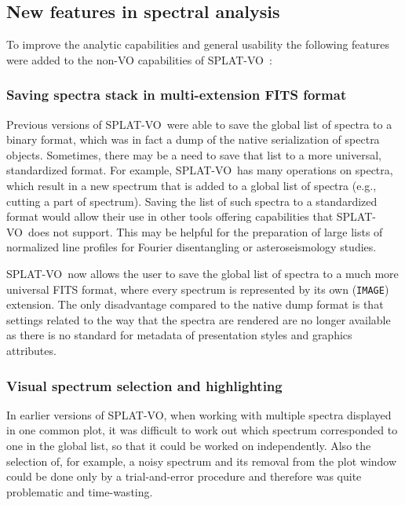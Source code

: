 \documentclass[final,authoryear,5p,times,twocolumn]{elsarticle}
\newcommand{\splatvo}{{\textsf{\small{SPLAT-VO}}}}
\begin{document}
\subsection{New features in spectral analysis}

\label{davids_functions}
To improve the analytic capabilities and general usability the following
features were added to the non-VO capabilities of \splatvo\ \citep{and146bcthesis}:

\subsubsection{Saving spectra stack in multi-extension FITS format}

Previous versions of \splatvo\ were able to save the global list of spectra to
a binary format, which was in fact a dump of the native serialization of
spectra objects. Sometimes, there may be a need to save that list to a more
universal, standardized format. For example, \splatvo\ has many operations on
spectra, which result in a new spectrum that is added to a global list of
spectra (e.g., cutting a part of spectrum). Saving the list of such spectra to
a standardized format would allow their use in other tools offering
capabilities that \splatvo\ does not support.  This may be helpful for the
preparation of large lists of normalized line profiles for Fourier
disentangling or asteroseismology studies.

\splatvo\ now allows the user to save the global list of spectra to a much more
universal FITS format, where every spectrum  is represented by its own (\texttt{IMAGE})
extension.  The only disadvantage compared to the native dump format is that
settings related to the way that the spectra are rendered are no longer
available as there is no standard for metadata of presentation styles and
graphics attributes.
 
\subsubsection{Visual spectrum selection and highlighting}

In earlier versions of \splatvo, when working with multiple spectra displayed
in one common plot, it was difficult to work out which spectrum corresponded
to one in the global list, so that it could be worked on independently.
Also the selection of, for example, a noisy spectrum and its removal from
the plot window could be done only by a trial-and-error procedure and therefore
was quite problematic and time-wasting.
\end{document}
